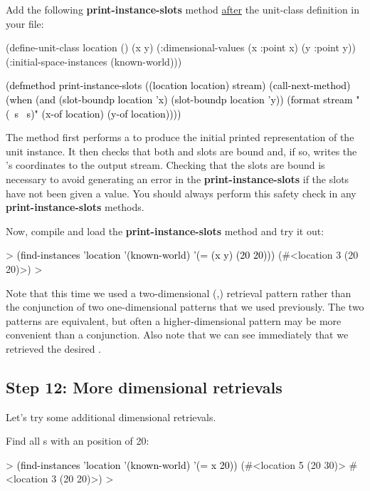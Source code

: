 \documentclass[10pt,twoside,english,pdftex]{article}
\begin{document}
%
Add the following \textbf {print-instance-slots} method \underline{after} the
 unit-class definition in your 
file:
%
\begin{example}\color{darkergray}%
  (define-unit-class location ()
    (x y)
    (:dimensional-values
      (x :point x)
      (y :point y))
    (:initial-space-instances (known-world)))

  \textcolor{black}{(defmethod print-instance-slots ((location location) stream)
    (call-next-method)
    (when (and (slot-boundp location 'x)
               (slot-boundp location 'y))
      (format stream " (~s ~s)"
              (x-of location)
              (y-of location))))}
\end{example}
%
The method first performs a  to produce the initial
printed representation of the  unit instance.  It then checks
that both  and  slots are bound and, if so, writes the
's coordinates to the output stream.  Checking that the slots
are bound is necessary to avoid generating an error in the
\textbf{print-instance-slots} if the slots have not been given a value.  You
should always perform this safety check in any \textbf{print-instance-slots}
methods.

%
Now, compile and load the \textbf {print-instance-slots} method and try it
out:
%
\begin{example}\color{darkergray}%
  > \textcolor{black}{(find-instances 'location '(known-world)
      '(= (x y) (20 20)))}
   (#<location 3 (20 20)>)
  >
\end{example}

Note that this time we used a two-dimensional (,) retrieval
pattern rather than the conjunction of two one-dimensional patterns that we
used previously.  The two patterns are equivalent, but often a
higher-dimensional pattern may be more convenient than a conjunction.  Also
note that we can see immediately that we retrieved the desired
.

\subsection*{Step 12: More dimensional retrievals}

%
Let's try some additional dimensional retrievals.

Find all s with an  position of 20:
%
\begin{example}\color{darkergray}%
  > \textcolor{black}{(find-instances 'location '(known-world)
      '(= x 20))}
   (#<location 5 (20 30)> #<location 3 (20 20)>)
  >
\end{example}
\end{document}
